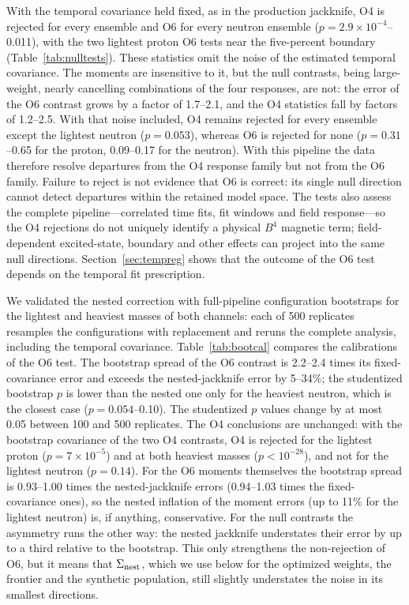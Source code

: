 \documentclass[aps,prd,preprint,nofootinbib,floatfix]{revtex4-2}
\begin{document}
With the temporal covariance held fixed, as in the production jackknife, O4 is rejected for every ensemble and O6 for every neutron ensemble ($p=2.9\times10^{-4}$--0.011), with the two lightest proton O6 tests near the five-percent boundary (Table~\ref{tab:nulltests}). These statistics omit the noise of the estimated temporal covariance. The moments are insensitive to it, but the null contrasts, being large-weight, nearly cancelling combinations of the four responses, are not: the error of the O6 contrast grows by a factor of 1.7--2.1, and the O4 statistics fall by factors of 1.2--2.5. With that noise included, O4 remains rejected for every ensemble except the lightest neutron ($p=0.053$), whereas O6 is rejected for none ($p=0.31$--0.65 for the proton, 0.09--0.17 for the neutron). With this pipeline the data therefore resolve departures from the O4 response family but not from the O6 family. Failure to reject is not evidence that O6 is correct: its single null direction cannot detect departures within the retained model space. The tests also assess the complete pipeline---correlated time fits, fit windows and field response---so the O4 rejections do not uniquely identify a physical $B^4$ magnetic term; field-dependent excited-state, boundary and other effects can project into the same null directions. Section~\ref{sec:tempreg} shows that the outcome of the O6 test depends on the temporal fit prescription.

We validated the nested correction with full-pipeline configuration bootstraps for the lightest and heaviest masses of both channels: each of 500 replicates resamples the configurations with replacement and reruns the complete analysis, including the temporal covariance. Table~\ref{tab:bootcal} compares the calibrations of the O6 test. The bootstrap spread of the O6 contrast is 2.2--2.4 times its fixed-covariance error and exceeds the nested-jackknife error by 5--34\%; the studentized bootstrap $p$ is lower than the nested one only for the heaviest neutron, which is the closest case ($p=0.054$--0.10). The studentized $p$ values change by at most 0.05 between 100 and 500 replicates. The O4 conclusions are unchanged: with the bootstrap covariance of the two O4 contrasts, O4 is rejected for the lightest proton ($p=7\times10^{-5}$) and at both heaviest masses ($p<10^{-28}$), and not for the lightest neutron ($p=0.14$). For the O6 moments themselves the bootstrap spread is 0.93--1.00 times the nested-jackknife errors (0.94--1.03 times the fixed-covariance ones), so the nested inflation of the moment errors (up to 11\% for the lightest neutron) is, if anything, conservative. For the null contrasts the asymmetry runs the other way: the nested jackknife understates their error by up to a third relative to the bootstrap. This only strengthens the non-rejection of O6, but it means that $\Sigma_{\rm nest}$, which we use below for the optimized weights, the frontier and the synthetic population, still slightly understates the noise in its smallest directions.
\end{document}
